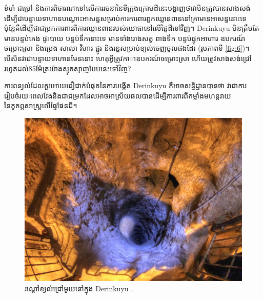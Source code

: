 \documentclass[10pt,twocolumn,letterpaper]{article}
\begin{document}
ទំហំ ជម្រៅ និងការពិចារណាទៅលើការរចនានៃទីក្រុងក្រោមដីនេះបង្ហាញថាវាមិនត្រូវបានសាងសង់ដើម្បីជាបន្ទាយទាហានបណ្តោះអាសន្នសម្រាប់ការការពារពួកឈ្លានពាននៅគ្រាមានអាសន្ននោះទេ ប៉ុន្តែគឺដើម្បីជាជម្រកការពារពីការឈ្លានពានរបស់យោធានៅលើផ្ទៃដីទៅវិញ។ Derinkuyu មិនត្រឹមតែមានបន្ទប់គេង ផ្ទះបាយ បន្ទប់ទឹកនោះទេ មានទាំងរោងសត្វ ពាងទឹក បន្ទប់ផ្ទុកអាហារ ឧបករណ៍ចម្រោះស្រា និងប្រេង សាលា វិហារ ផ្នូរ និងរន្ធសម្រាប់ខ្យល់ចេញចូលផងដែរ (រូបភាពទី \ref{fig:6})។ បើសិនវាជាបន្ទាយទាហានមែននោះ ហេតុអ្វីត្រូវកាាឧបករណ៍ចម្រោះស្រា ហើយត្រូវសាងសង់ជ្រៅរហូតដល់85ម៉ែត្រយ៉ាងស្មុគស្មាញបែបនេះទៅវិញ?

ការពន្យល់ដែលគួរអោយជឿជាក់បំផុតនៃការបង្កើត Derinkuyu គឺអាចសន្និដ្ឋានបានថា វាជាការរៀបចំរយៈពេលវែងនិងជាជម្រកដែលអាចអាស្រ័យផលបានដើម្បីការពារពីកម្លាំងមហន្តរាយនៃភូគព្ភសាស្ត្រលើផ្ទៃផែនដី។

\begin{figure}[t]
\begin{center}
   \includegraphics[width=1\linewidth]{derinkuyu-air.jpg}
\end{center}
   \caption{រណ្តៅខ្យល់ជ្រៅមួយនៅក្នុង Derinkuyu \cite{53}.}
\label{fig:6}
\label{fig:onecol}
\end{figure}


\end{document}
